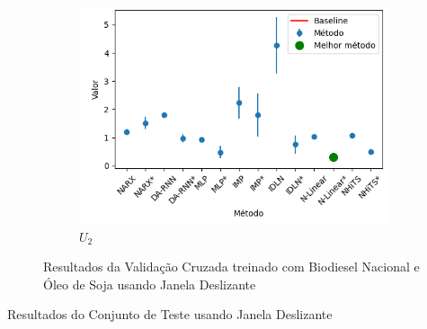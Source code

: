 \begin{figure}[htbp]
\begin{subfigure}[b]{0.3\textwidth}
		\includegraphics[width=\textwidth]{figuras/u2_brasil_oil_results.png}
		\caption{\(U_2\)}
		\label{fig:u2_brasil_oil_results}
	\end{subfigure}
	\caption{Resultados da Validação Cruzada treinado com Biodiesel Nacional e Óleo de Soja usando Janela Deslizante}
	\label{fig:brasil_oil_results}
\end{figure}
\begin{table}[ht]
	\centering
	\caption{Resultados do Conjunto de Teste usando Janela Deslizante}
	\label{tab:resultados_teste}
	\begin{adjustbox}{angle=90, scale=0.65}
		
	\end{adjustbox}
\end{table}
